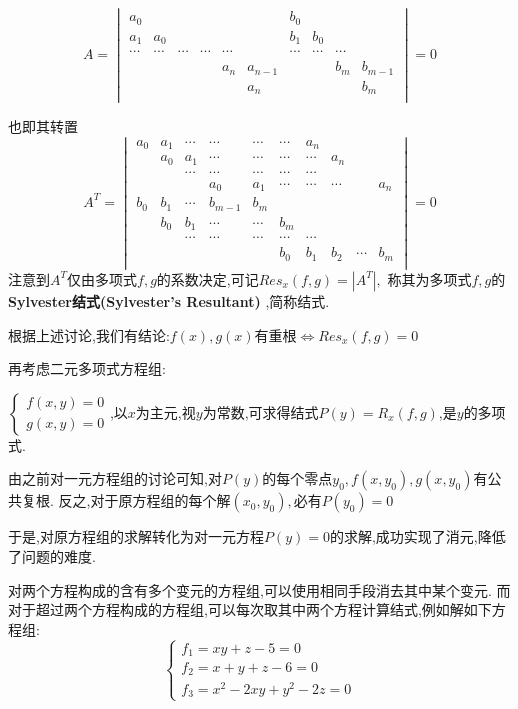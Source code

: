 	\[ A=\begin{vmatrix} 
		a_0	&	&	&	&	 &		& b_0 &		&	 &	\\
		a_1	&a_0&	&	&			&	& b_1 & b_0	&	&	\\
  \cdots &\cdots &\cdots &\cdots	&  \cdots&	& \cdots &\cdots	&	\cdots	&	\\
		 &	&	&	&a_n &a_{n-1}   &		&	& b_m  & b_{m-1} \\
		 &	&	&	&	 &a_n		&		&	&	  & b_m\\
	\end{vmatrix} = 0\]

	也即其转置
	\[A^{T}= \begin{vmatrix}
	a_0 & a_1 & \cdots & \cdots & \cdots & \cdots & a_n		&		&	&   \\
		& a_0 & a_1	   & \cdots & \cdots & \cdots & \cdots  &a_n   &	&	\\
		&	  & \cdots & \cdots & \cdots & \cdots & \cdots &		&	&	\\
		&	  &		   & a_0	& a_1	 & \cdots & \cdots & \cdots &	& a_n\\
	b_0 & b_1 & \cdots & b_{m-1}& b_m		 &		  &		   &		&	&   \\
		& b_0 & b_1	   & \cdots  &\cdots &b_m   	&		&		&	&	\\
		&	  & \cdots & \cdots & \cdots & \cdots & \cdots &		&	&	\\
		&	  &		   &		&		&   b_0   & b_1		& b_2	& \cdots & b_m\\
	\end{vmatrix} =0\]
	注意到$ A^{T}$仅由多项式$ f,g$的系数决定,可记$ Res_x(f,g)=|A^{T}|,$
	称其为多项式$ f,g$的{\bf Sylvester结式(Sylvester's Resultant) },简称结式.

	根据上述讨论,我们有结论:$ f(x),g(x)$有重根$ \Leftrightarrow Res_x(f,g) = 0$
	
	\vspace{13pt}
	再考虑二元多项式方程组:

	$ \begin{cases}
		f(x,y)=0 \\g(x,y)=0 
	\end{cases}$,以$ x$为主元,视$ y$为常数,可求得结式$ P(y) = R_x(f,g)$,是$ y$的多项式.

	由之前对一元方程组的讨论可知,对$ P(y)$的每个零点$ y_0,f(x,y_0),g(x,y_0)$有公共复根.
	反之,对于原方程组的每个解$ (x_0,y_0), $必有$ P(y_0) = 0$

	于是,对原方程组的求解转化为对一元方程$ P(y) = 0$的求解,成功实现了消元,降低了问题的难度.
	
	\vspace{13pt}
	对两个方程构成的含有多个变元的方程组,可以使用相同手段消去其中某个变元.
	而对于超过两个方程构成的方程组,可以每次取其中两个方程计算结式,例如解如下方程组:
	\[  \begin{cases} f_1 = xy+z-5 = 0\\ f_2 = x+y+z-6 = 0 \\ f_3 = x^2-2xy+y^2-2z = 0
	\end{cases}\]

